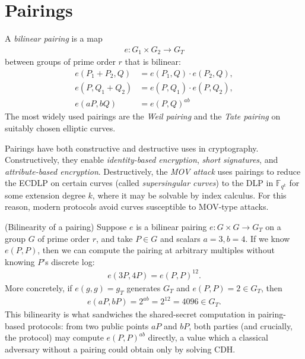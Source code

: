 \documentclass[a4paper, 12pt]{book} %
\begin{document}
\section{Pairings}

\begin{definition}
    A \emph{bilinear pairing} is a map
    \begin{align}
        e: G_1 \times G_2 \longrightarrow G_T
    \end{align}
    between groups of prime order $r$ that is bilinear:
    \begin{align}
        e(P_1 + P_2, Q) &= e(P_1, Q) \cdot e(P_2, Q), \\
        e(P, Q_1 + Q_2) &= e(P, Q_1) \cdot e(P, Q_2), \\
        e(aP, bQ) &= e(P, Q)^{ab}
    \end{align}
    The most widely used pairings are the \emph{Weil pairing} and the \emph{Tate pairing} on suitably chosen elliptic curves.
\end{definition}

\begin{remark}
    Pairings have both constructive and destructive uses in cryptography. Constructively, they enable \emph{identity-based encryption}, \emph{short signatures}, and \emph{attribute-based encryption}. Destructively, the \emph{MOV attack} uses pairings to reduce the ECDLP on certain curves (called \emph{supersingular curves}) to the DLP in $\mathbb{F}_{q^k}$ for some extension degree $k$, where it may be solvable by index calculus. For this reason, modern protocols avoid curves susceptible to MOV-type attacks.
\end{remark}

\begin{example}
    (Bilinearity of a pairing) Suppose $e$ is a bilinear pairing $e: G \times G \to G_T$ on a group $G$ of prime order $r$, and take $P \in G$ and scalars $a = 3, b = 4$. If we know $e(P, P)$, then we can compute the pairing at arbitrary multiples without knowing $P$'s discrete log:
    \begin{align}
        e(3P, 4P) = e(P, P)^{12}.
    \end{align}
    More concretely, if $e(g, g) = g_T$ generates $G_T$ and $e(P,P) = 2 \in G_T$, then
    \begin{align}
        e(aP, bP) = 2^{ab} = 2^{12} = 4096 \in G_T.
    \end{align}
    This bilinearity is what sandwiches the shared-secret computation in pairing-based protocols: from two public points $aP$ and $bP$, both parties (and crucially, the protocol) may compute $e(P,P)^{ab}$ directly, a value which a classical adversary without a pairing could obtain only by solving CDH.
\end{example}
\end{document}
